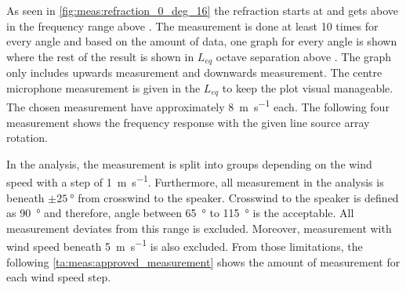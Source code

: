 
As seen in \autoref{fig:meas:refraction_0_deg_16} the refraction starts at  and gets above  in the frequency range above . The measurement is done at least 10 times for every angle and based on the amount of data, one graph for every angle is shown where the rest of the result is shown in $L_{eq}$ octave separation above . The graph only includes upwards measurement and downwards measurement. The centre microphone measurement is given in the $L_{eq}$  to keep the plot visual manageable. The chosen measurement have approximately \SI{8}{\meter\per\second} each. The following four measurement shows the frequency response with the given line source array rotation.


In the analysis, the measurement is split into groups depending on the wind speed with a step of \SI{1}{\meter\per\second}. Furthermore, all measurement in the analysis is beneath $\pm\SI{25}{\degree}$ from crosswind to the speaker. Crosswind to the speaker is defined as \SI{90}{\degree} and therefore, angle between \SI{65}{\degree} to \SI{115}{\degree} is the acceptable. All measurement deviates from this range is excluded. Moreover, measurement with wind speed beneath \SI{5}{\meter\per\second} is also excluded. From those limitations, the following \autoref{ta:meas:approved_measurement} shows the amount of measurement for each wind speed step. 

